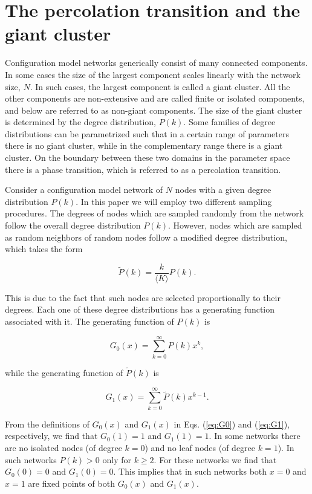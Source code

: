 \documentclass[preprint,pre,superscriptaddress,showpacs]{revtex4}
\begin{document}
\section{The percolation transition and the giant cluster}

Configuration model networks generically consist of many connected 
components. In some cases the size of the largest component
scales linearly with the network size, $N$. In such cases, the largest
component is called a giant cluster.
All the other components are non-extensive and are called 
finite or isolated components, and below are referred to as 
non-giant components. 
The size of the giant cluster is determined by the 
degree distribution, $P(k)$.
Some families of degree distributions can be parametrized such
that in a certain range of parameters there is no giant cluster,
while in the complementary range there is a giant cluster.
On the boundary between these two domains in the parameter
space there is a 
phase transition, which is referred to as a
percolation transition.

Consider a configuration model network 
of $N$ nodes with a given degree distribution $P(k)$.
In this paper we will employ two different sampling
procedures. The degrees of nodes which are sampled randomly 
from the network follow the overall degree distribution $P(k)$.
However, nodes which are sampled as random neighbors 
of random nodes follow a modified degree distribution,
which takes the form

\begin{equation}
{\widetilde P}(k) = \frac{k}{\langle K \rangle} P(k).
\label{eq:tilde}
\end{equation}

\noindent
This is due to the fact that such nodes are selected proportionally
to their degrees.
Each one of these degree distributions has a generating function
associated with it.
The generating function of $P(k)$ is 


\begin{equation}
G_0(x) = \sum_{k=0}^{\infty}  P(k) x^{k},
\label{eq:G0}
\end{equation}

\noindent
while the generating function of $\widetilde P(k)$ is


\begin{equation}
G_1(x) = \sum_{k=0}^{\infty} {\widetilde P}(k) x^{k-1}.
\label{eq:G1}
\end{equation}

\noindent
From the definitions of 
$G_0(x)$ and $G_1(x)$ in Eqs.
(\ref{eq:G0})
and 
(\ref{eq:G1}),
respectively,
we find that
$G_0(1)=1$
and
$G_1(1)=1$.
In some networks there are no isolated nodes (of degree $k=0$)
and no leaf nodes (of degree $k=1$). 
In such networks
$P(k) > 0$ only for $k \ge 2$. 
For these networks
we find that
$G_0(0) = 0$ 
and
$G_1(0)=0$.
This implies that in such networks both $x=0$ and $x=1$ are fixed points
of both $G_0(x)$ and $G_1(x)$.
\end{document}
